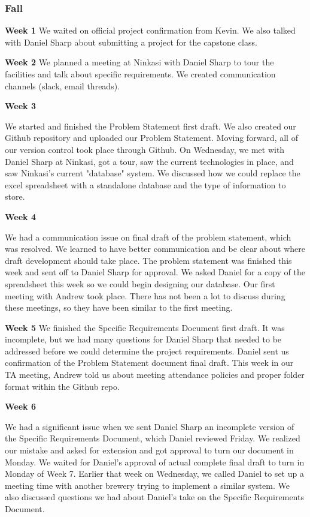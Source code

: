 \subsubsection{Fall}
\hfill\break
\noindent\medskip\textbf{Week 1}
We waited on official project confirmation from Kevin.
We also talked with Daniel Sharp about submitting a project for the capstone class.

\noindent\medskip\textbf{Week 2}
We planned a meeting at Ninkasi with Daniel Sharp to tour the facilities and talk about specific requirements.
We created communication channels (slack, email threads).

\noindent\medskip\textbf{Week 3}

We started and finished the Problem Statement first draft.
We also created our Github repository and uploaded our Problem Statement.
Moving forward, all of our version control took place through Github.
On Wednesday, we met with Daniel Sharp at Ninkasi, got a tour, saw the current technologies in place, and saw Ninkasi's current "database" system.
We discussed how we could replace the excel spreadsheet with a standalone database and the type of information to store.

\noindent\medskip\textbf{Week 4}

We had a communication issue on final draft of the problem statement, which was resolved.
We learned to have better communication and be clear about where draft development should take place.
The problem statement was finished this week and sent off to Daniel Sharp for approval.
We asked Daniel for a copy of the spreadsheet this week so we could begin designing our database.
Our first meeting with Andrew took place.
There has not been a lot to discuss during these meetings, so they have been similar to the first meeting.

\noindent\medskip\textbf{Week 5}
We finished the Specific Requirements Document first draft.
It was incomplete, but we had many questions for Daniel Sharp that needed to be addressed before we could determine the project requirements.
Daniel sent us confirmation of the Problem Statement document final draft.
This week in our TA meeting, Andrew told us about meeting attendance policies and proper folder format within the Github repo.


\noindent\medskip\textbf{Week 6}

We had a significant issue when we sent Daniel Sharp an incomplete version of the Specific Requirements Document, which Daniel reviewed Friday.
We realized our mistake and asked for extension and got approval to turn our document in Monday.
We waited for Daniel’s approval of actual complete final draft to turn in Monday of Week 7.
Earlier that week on Wednesday, we called Daniel to set up a meeting time with another brewery trying to implement a similar system.
We also discussed questions we had about Daniel’s take on the Specific Requirements Document.

